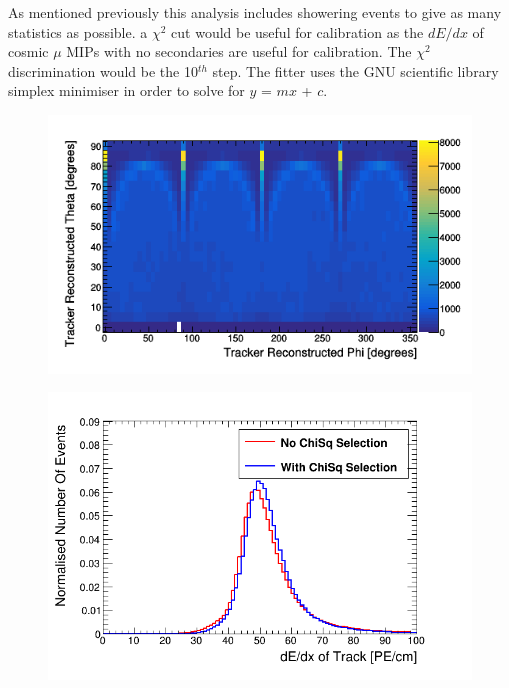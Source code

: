 As mentioned previously this analysis includes showering events to give as many statistics as possible. a $\chi^2$ cut would be useful for calibration as the $dE/dx$ of cosmic $\mu$ MIPs with no secondaries are useful for calibration. The $\chi^2$ discrimination would be the 10$^{th}$ step. The fitter uses the GNU scientific library simplex minimiser \cite{galassi2002gnu} in order to solve for $y$ = $mx$ + $c$.  

\begin{figure}[!h]
\centering
\begin{minipage}{.45\textwidth}
  \centering
  \includegraphics[width=\linewidth]{Chapter5/Figs/Raster/pvsTFiduicalHemisphere.png}
  \label{fig:simulatedHemisphereDist}
\end{minipage}%
\qquad
\begin{minipage}{.45\textwidth}
  \centering
  \includegraphics[width=\linewidth]{Chapter6/Figs/simHemDeDx.png}
  \label{fig:dedxGenVsRecoHem}
\end{minipage}
\end{figure}

